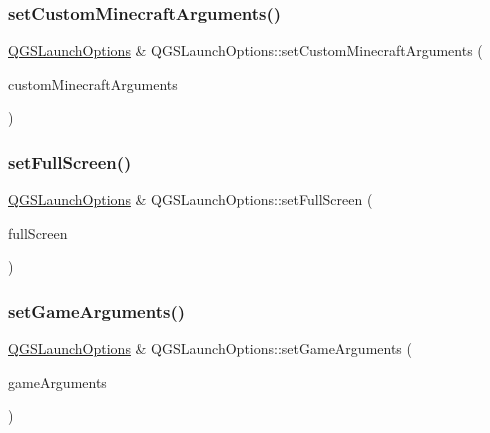 \mbox{\label{class_q_g_s_launch_options_a4eb96356215746ae1bff3bcae689572b}} 
\subsubsection{\texorpdfstring{set\+Custom\+Minecraft\+Arguments()}{setCustomMinecraftArguments()}}
{\footnotesize\ttfamily \mbox{\hyperlink{class_q_g_s_launch_options}{Q\+G\+S\+Launch\+Options}} \& Q\+G\+S\+Launch\+Options\+::set\+Custom\+Minecraft\+Arguments (\begin{DoxyParamCaption}\item[{const Q\+Map$<$ Q\+String, Q\+String $>$ \&}]{custom\+Minecraft\+Arguments }\end{DoxyParamCaption})}

\mbox{\label{class_q_g_s_launch_options_a829e0bd53dd59cd4c5ef7a10b12d6205}} 
\subsubsection{\texorpdfstring{set\+Full\+Screen()}{setFullScreen()}}
{\footnotesize\ttfamily \mbox{\hyperlink{class_q_g_s_launch_options}{Q\+G\+S\+Launch\+Options}} \& Q\+G\+S\+Launch\+Options\+::set\+Full\+Screen (\begin{DoxyParamCaption}\item[{const bool}]{full\+Screen }\end{DoxyParamCaption})}

\mbox{\label{class_q_g_s_launch_options_a156e2a1da90fac4e6d133e7c81590809}} 
\subsubsection{\texorpdfstring{set\+Game\+Arguments()}{setGameArguments()}}
{\footnotesize\ttfamily \mbox{\hyperlink{class_q_g_s_launch_options}{Q\+G\+S\+Launch\+Options}} \& Q\+G\+S\+Launch\+Options\+::set\+Game\+Arguments (\begin{DoxyParamCaption}\item[{const Q\+String \&}]{game\+Arguments }\end{DoxyParamCaption})}


